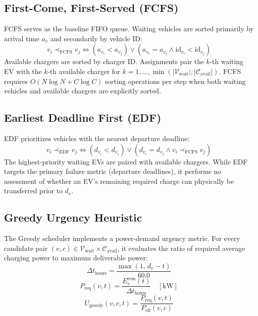\documentclass[conference]{IEEEtran}
\begin{document}
\subsection{First-Come, First-Served (FCFS)}
FCFS serves as the baseline FIFO queue. Waiting vehicles are sorted primarily by arrival time $a_v$ and secondarily by vehicle ID:
\begin{equation}
v_i \prec_{\mathrm{FCFS}} v_j \iff (a_{v_i} < a_{v_j}) \lor (a_{v_i} = a_{v_j} \land \mathrm{id}_{v_i} < \mathrm{id}_{v_j})
\end{equation}
Available chargers are sorted by charger ID. Assignments pair the $k$-th waiting EV with the $k$-th available charger for $k = 1, \dots, \min(|\mathcal{V}_{\mathrm{wait}}|, |\mathcal{C}_{\mathrm{avail}}|)$. FCFS requires $O(N \log N + C \log C)$ sorting operations per step when both waiting vehicles and available chargers are explicitly sorted.

\subsection{Earliest Deadline First (EDF)}
EDF prioritizes vehicles with the nearest departure deadline:
\begin{equation}
v_i \prec_{\mathrm{EDF}} v_j \iff (d_{v_i} < d_{v_j}) \lor (d_{v_i} = d_{v_j} \land v_i \prec_{\mathrm{FCFS}} v_j)
\end{equation}
The highest-priority waiting EVs are paired with available chargers. While EDF targets the primary failure metric (departure deadlines), it performs no assessment of whether an EV's remaining required charge can physically be transferred prior to $d_v$.

\subsection{Greedy Urgency Heuristic}
The Greedy scheduler implements a power-demand urgency metric. For every candidate pair $(v, c) \in \mathcal{V}_{\mathrm{wait}} \times \mathcal{C}_{\mathrm{avail}}$, it evaluates the ratio of required average charging power to maximum deliverable power:
\begin{equation}
\Delta t_{\mathrm{hours}} = \frac{\max(1, \, d_v - t)}{60.0}
\end{equation}
\begin{equation}
P_{\mathrm{req}}(v, t) = \frac{E_v^{\mathrm{rem}}(t)}{\Delta t_{\mathrm{hours}}} \quad [\text{kW}]
\end{equation}
\begin{equation}
U_{\mathrm{greedy}}(v, c, t) = \frac{P_{\mathrm{req}}(v, t)}{P_{\mathrm{eff}}(v, c)}
\label{eq:greedy_urgency}
\end{equation}
\end{document}
